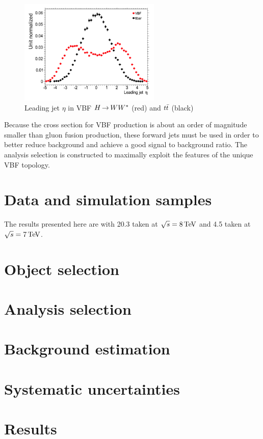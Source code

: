 \begin{figure}
  \vspace{20pt}
  \centering
  \hspace*{-32pt}
  \includegraphics[width=0.6\textwidth]{figures/VBF_LeadJetEta}
  \caption{Leading jet $\eta$ in VBF $H{\,{\rightarrow}\,}WW^\ast$ (red) and $t\bar{t}$ (black)}
  \label{fig:VBF_LeadJetEta}
\end{figure}

Because the cross section for VBF production is about an order of magnitude smaller than gluon fusion production, these forward jets must be used in order to better reduce background and achieve a good signal to background ratio. The analysis selection is constructed to maximally exploit the features of the unique VBF topology. 

\section{Data and simulation samples}

The results presented here are with 20.3 \ifb taken at $\sqrt{s} = 8 \TeV$ and 4.5 \ifb taken at $\sqrt{s} = 7 \TeV$. 

\section{Object selection}

\section{Analysis selection}

\section{Background estimation}

\section{Systematic uncertainties}

\section{Results}
